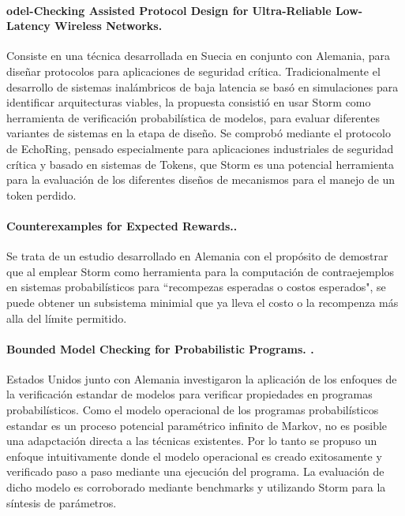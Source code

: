 \documentclass[11pt]{article}
\begin{document}
\paragraph{odel-Checking Assisted Protocol Design for Ultra-Reliable Low-Latency Wireless Networks. \cite{Christian}}


Consiste en una t\'ecnica desarrollada en Suecia en conjunto con Alemania, para dise\~nar protocolos para aplicaciones de seguridad cr\'itica. Tradicionalmente el desarrollo de sistemas inal\'ambricos de baja latencia se bas\'o en simulaciones para identificar arquitecturas viables, la propuesta consisti\'o en usar Storm como herramienta de verificaci\'on probabil\'istica de modelos, para evaluar diferentes variantes de sistemas en la etapa de dise\~no. Se comprob\'o mediante el protocolo de EchoRing, pensado especialmente para aplicaciones industriales de seguridad cr\'itica y basado en sistemas de Tokens, que Storm es una potencial herramienta para la evaluaci\'on de los diferentes dise\~nos de mecanismos para el manejo de un token perdido.

\paragraph{Counterexamples for Expected Rewards.\cite{Tim}.}

Se trata de un estudio desarrollado en Alemania con el prop\'osito de demostrar que al emplear Storm como herramienta para la computaci\'on de contraejemplos en sistemas probabil\'isticos para ``recompezas esperadas o costos esperados", se puede obtener un subsistema minimial que ya lleva el costo o la recompenza m\'as alla del l\'imite permitido.

\paragraph{Bounded Model Checking for Probabilistic Programs. \cite{Nils}.}

Estados Unidos junto con Alemania investigaron la aplicaci\'on de los enfoques de la verificaci\'on estandar de modelos para verificar propiedades en programas probabil\'isticos. Como el modelo operacional de los programas probabil\'isticos estandar es un proceso potencial param\'etrico infinito de Markov, no es posible una adapctaci\'on directa a las t\'ecnicas existentes. Por lo tanto se propuso un enfoque intuitivamente donde el modelo operacional es creado exitosamente y verificado paso a paso mediante una ejecuci\'on del programa. La evaluaci\'on de dicho modelo es corroborado mediante benchmarks y utilizando Storm para la s\'intesis de par\'ametros.
\end{document}
